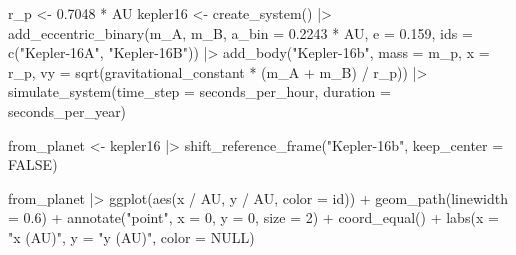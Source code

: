 \documentclass[
  10.5pt,
  letterpaper,
]{scrbook}
\newenvironment{Shaded}{\begin{snugshade}}{\end{snugshade}}
\newcommand{\AttributeTok}[1]{\textcolor[rgb]{0.00,0.00,0.00}{#1}}
\newcommand{\ConstantTok}[1]{\textcolor[rgb]{0.00,0.00,0.00}{#1}}
\newcommand{\DecValTok}[1]{\textcolor[rgb]{0.00,0.00,0.00}{#1}}
\newcommand{\FloatTok}[1]{\textcolor[rgb]{0.00,0.00,0.00}{#1}}
\newcommand{\FunctionTok}[1]{\textcolor[rgb]{0.00,0.00,0.00}{#1}}
\newcommand{\NormalTok}[1]{\textcolor[rgb]{0.00,0.00,0.00}{#1}}
\newcommand{\OtherTok}[1]{\textcolor[rgb]{0.00,0.00,0.00}{#1}}
\newcommand{\SpecialCharTok}[1]{\textcolor[rgb]{0.00,0.00,0.00}{#1}}
\newcommand{\StringTok}[1]{\textcolor[rgb]{0.00,0.00,0.00}{#1}}
\theoremstyle{plain}
\theoremstyle{remark}
\begin{document}
\begin{Shaded}
\begin{Highlighting}[]
\NormalTok{r\_p }\OtherTok{\textless{}{-}} \FloatTok{0.7048} \SpecialCharTok{*}\NormalTok{ AU}
\NormalTok{kepler16 }\OtherTok{\textless{}{-}} \FunctionTok{create\_system}\NormalTok{() }\SpecialCharTok{|\textgreater{}}
  \FunctionTok{add\_eccentric\_binary}\NormalTok{(m\_A, m\_B, }\AttributeTok{a\_bin =} \FloatTok{0.2243} \SpecialCharTok{*}\NormalTok{ AU, }\AttributeTok{e =} \FloatTok{0.159}\NormalTok{,}
                       \AttributeTok{ids =} \FunctionTok{c}\NormalTok{(}\StringTok{"Kepler{-}16A"}\NormalTok{, }\StringTok{"Kepler{-}16B"}\NormalTok{)) }\SpecialCharTok{|\textgreater{}}
  \FunctionTok{add\_body}\NormalTok{(}\StringTok{"Kepler{-}16b"}\NormalTok{, }\AttributeTok{mass =}\NormalTok{ m\_p, }\AttributeTok{x =}\NormalTok{ r\_p,}
           \AttributeTok{vy =} \FunctionTok{sqrt}\NormalTok{(gravitational\_constant }\SpecialCharTok{*}\NormalTok{ (m\_A }\SpecialCharTok{+}\NormalTok{ m\_B) }\SpecialCharTok{/}\NormalTok{ r\_p)) }\SpecialCharTok{|\textgreater{}}
  \FunctionTok{simulate\_system}\NormalTok{(}\AttributeTok{time\_step =}\NormalTok{ seconds\_per\_hour, }\AttributeTok{duration =}\NormalTok{ seconds\_per\_year)}

\NormalTok{from\_planet }\OtherTok{\textless{}{-}}\NormalTok{ kepler16 }\SpecialCharTok{|\textgreater{}}
  \FunctionTok{shift\_reference\_frame}\NormalTok{(}\StringTok{"Kepler{-}16b"}\NormalTok{, }\AttributeTok{keep\_center =} \ConstantTok{FALSE}\NormalTok{)}
\end{Highlighting}
\end{Shaded}

\begin{Shaded}
\begin{Highlighting}[]
\NormalTok{from\_planet }\SpecialCharTok{|\textgreater{}}
  \FunctionTok{ggplot}\NormalTok{(}\FunctionTok{aes}\NormalTok{(x }\SpecialCharTok{/}\NormalTok{ AU, y }\SpecialCharTok{/}\NormalTok{ AU, }\AttributeTok{color =}\NormalTok{ id)) }\SpecialCharTok{+}
  \FunctionTok{geom\_path}\NormalTok{(}\AttributeTok{linewidth =} \FloatTok{0.6}\NormalTok{) }\SpecialCharTok{+}
  \FunctionTok{annotate}\NormalTok{(}\StringTok{"point"}\NormalTok{, }\AttributeTok{x =} \DecValTok{0}\NormalTok{, }\AttributeTok{y =} \DecValTok{0}\NormalTok{, }\AttributeTok{size =} \DecValTok{2}\NormalTok{) }\SpecialCharTok{+}
  \FunctionTok{coord\_equal}\NormalTok{() }\SpecialCharTok{+}
  \FunctionTok{labs}\NormalTok{(}\AttributeTok{x =} \StringTok{"x (AU)"}\NormalTok{, }\AttributeTok{y =} \StringTok{"y (AU)"}\NormalTok{, }\AttributeTok{color =} \ConstantTok{NULL}\NormalTok{)}
\end{Highlighting}
\end{Shaded}
\end{document}
